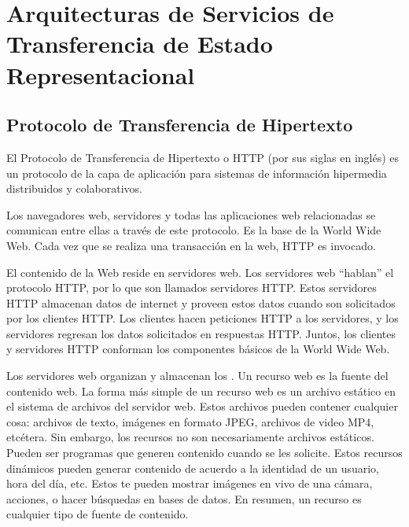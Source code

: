 
\section{Arquitecturas de Servicios de Transferencia de Estado Representacional}
\label{\detokenize{chapter_one/rest:arquitecturas-de-servicios-de-transferencia-de-estado-representacional}}\label{\detokenize{chapter_one/rest::doc}}

\subsection{Protocolo de Transferencia de Hipertexto}
\label{\detokenize{chapter_one/rest:protocolo-de-transferencia-de-hipertexto}}
\begin{remark}
El Protocolo de Transferencia de Hipertexto o HTTP (por sus siglas en inglés)
es un protocolo de la capa de aplicación para sistemas de información
hipermedia distribuidos y colaborativos.

\end{remark}

Los navegadores web, servidores y todas las aplicaciones web
relacionadas se comunican entre ellas a través de este protocolo. Es la
base de la World Wide Web. Cada vez que se realiza una transacción en la
web, HTTP es invocado.

El contenido de la Web reside en servidores web. Los servidores web
“hablan” el protocolo HTTP, por lo que son llamados servidores HTTP.
Estos servidores HTTP almacenan datos de internet y proveen estos datos
cuando son solicitados por los clientes HTTP. Los clientes hacen
peticiones HTTP a los servidores, y los servidores regresan los datos
solicitados en respuestas HTTP. Juntos, los clientes y servidores HTTP
conforman los componentes básicos de la World Wide Web.

Los servidores web organizan y almacenan los . Un recurso
web es la fuente del contenido web. La forma más simple de un recurso
web es un archivo estático en el sistema de archivos del servidor web.
Estos archivos pueden contener cualquier cosa: archivos de texto,
imágenes en formato JPEG, archivos de video MP4, etcétera. Sin embargo,
los recursos no son necesariamente archivos estáticos. Pueden ser
programas que generen contenido cuando se les solicite. Estos recursos
dinámicos pueden generar contenido de acuerdo a la identidad de un
usuario, hora del día, etc. Estos te pueden mostrar imágenes en vivo de
una cámara, acciones, o hacer búsquedas en bases de datos.
En resumen, un recurso es cualquier tipo de fuente de contenido.


